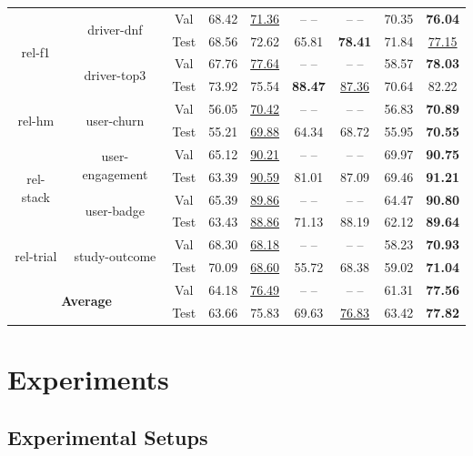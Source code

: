 \documentclass[11pt]{article}
\begin{document}
\begin{table}[t]
{\begin{tabular}{ccccccc|cc}
     \multirow{4}{*}{rel-f1} & \multirow{2}{*}{driver-dnf} & Val & 68.42 & \underline{71.36} & -- -- & -- -- & 70.35 & \textbf{76.04}  \\
     & & Test & 68.56 & {72.62} & 65.81 & \textbf{78.41} & 71.84 & \underline{77.15} \\
     & \multirow{2}{*}{driver-top3} & Val & 67.76 & \underline{77.64} & -- -- & -- -- & 58.57 & \textbf{78.03}\\
     & & Test & 73.92 & 75.54 & \textbf{88.47} & \underline{87.36} & 70.64 &  82.22\\   \midrule
     \multirow{2}{*}{rel-hm} & \multirow{2}{*}{user-churn} & Val & 56.05 & \underline{70.42} & -- -- & -- -- & 56.83 & \textbf{70.89 }\\
     & & Test & 55.21 & \underline{69.88} & 64.34 &  68.72 & 55.95 & \textbf{70.55} \\  \midrule
     \multirow{4}{*}{rel-stack} & \multirow{2}{*}{user-engagement} & Val & 65.12 & \underline{90.21} & -- -- & -- -- &  69.97 & \textbf{90.75} \\
     & & Test & 63.39 & \underline{90.59} & 81.01 & 87.09 & 69.46 & \textbf{91.21} \\
     & \multirow{2}{*}{user-badge} & Val & 65.39 & \underline{89.86} & -- -- & -- -- & 64.47 & \textbf{90.80} \\
     & & Test & 63.43 & \underline{88.86} & 71.13 & 88.19 & 62.12 &  \textbf{89.64} \\  \midrule
     \multirow{2}{*}{rel-trial} & \multirow{2}{*}{study-outcome} & Val & 68.30 & \underline{68.18} & -- -- & -- -- &  58.23 & \textbf{70.93} \\
     & & Test & 70.09 & \underline{68.60} & 55.72 & 68.38 & 59.02 & \textbf{71.04}  \\  \midrule
     \multicolumn{2}{c}{\multirow{2}{*}{\textbf{Average}}} & Val & 64.18 & \underline{76.49} & -- -- & -- -- & 61.31 & \textbf{77.56} \\
     & & Test & 63.66 & {75.83} & 69.63 & \underline{76.83} & 63.42 & \textbf{77.82} \\ \bottomrule 
\end{tabular}}
    \label{tab: cls}
\end{table}
\section{Experiments} 
\subsection{Experimental Setups}
\end{document}
